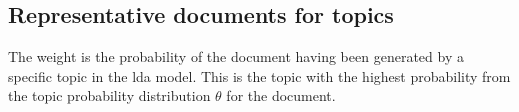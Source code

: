 \subsection{Representative documents for topics}

The weight is the probability of the document having been generated by a specific topic in the \gls{lda} model.
This is the topic with the highest probability from the topic probability distribution $\theta$ for the document.


